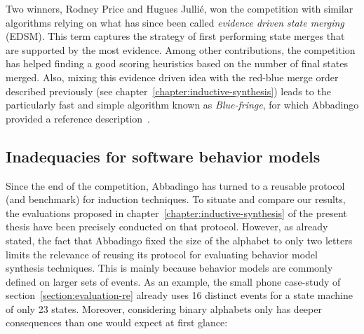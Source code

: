 Two winners, Rodney Price and Hugues Julli\'e, won the competition with similar algorithms relying on what has since been called \emph{evidence driven state merging} (EDSM). This term captures the strategy of first performing state merges that are supported by the most evidence. Among other contributions, the competition has helped finding a good scoring heuristics based on the number of final states merged. Also, mixing this evidence driven idea with the red-blue merge order described previously (see chapter~\ref{chapter:inductive-synthesis}) leads to the particularly fast and simple algorithm known as \emph{Blue-fringe}, for which Abbadingo provided a reference description~\cite{Lang98}.

\subsection{Inadequacies for software behavior models}

Since the end of the competition, Abbadingo has turned to a reusable protocol (and benchmark) for induction techniques. To situate and compare our results, the evaluations proposed in chapter~\ref{chapter:inductive-synthesis} of the present thesis have been precisely conducted on that protocol. However, as already stated, the fact that Abbadingo fixed the size of the alphabet to only two letters limits the relevance of reusing its protocol for evaluating behavior model synthesis techniques. This is mainly because behavior models are commonly defined on larger sets of events. As an example, the small phone case-study of section~\ref{section:evaluation-re} already uses 16 distinct events for a state machine of only 23 states. Moreover, considering binary alphabets only has deeper consequences than one would expect at first glance:

